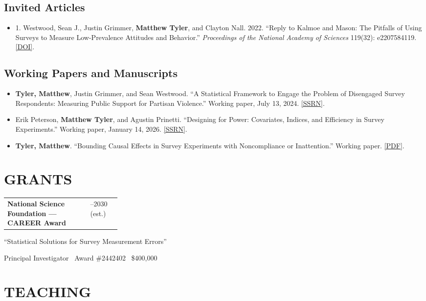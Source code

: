 \documentclass[11pt,a4paper]{article}
\makeatletter
\newcommand{\cvrow}[2]{%
  \noindent\begin{tabularx}{\linewidth}{@{}X>{\raggedleft\arraybackslash}p{0.27\linewidth}@{}}
  #1 & #2
  \end{tabularx}\par
}
\newenvironment{publicationlist}{%
  \begin{itemize}[leftmargin=2.1em,labelsep=0.45em,
                   topsep=0.3em,itemsep=0.6em,parsep=0pt]
}{\end{itemize}}
\newenvironment{manuscriptlist}{%
  \begin{itemize}[leftmargin=0pt,label={},
                   topsep=0.3em,itemsep=0.6em,parsep=0pt]
}{\end{itemize}}
\newcommand{\doi}[1]{\href{https://doi.org/#1}{[DOI]}}
\newcommand{\pdf}[1]{\href{#1}{[PDF]}}
\newcommand{\ssrn}[1]{\href{https://ssrn.com/abstract=#1}{[SSRN]}}
\makeatother
\begin{document}
\subsection*{Invited Articles}
\begin{publicationlist}
\item[1.] Westwood, Sean J., Justin Grimmer, \textbf{Matthew Tyler},
  and Clayton Nall. 2022.
  ``Reply to Kalmoe and Mason: The Pitfalls of Using Surveys to Measure
  Low-Prevalence Attitudes and Behavior.''
  \emph{Proceedings of the National Academy of Sciences}
  119(32): e2207584119. \doi{10.1073/pnas.2207584119}.
\end{publicationlist}

\subsection*{Working Papers and Manuscripts}
\begin{manuscriptlist}
\item \textbf{Tyler, Matthew}, Justin Grimmer, and Sean Westwood.
  ``A Statistical Framework to Engage the Problem of Disengaged Survey
  Respondents: Measuring Public Support for Partisan Violence.''
  Working paper, July 13, 2024. \ssrn{4894008}.

\item Erik Peterson, \textbf{Matthew Tyler}, and Agustin Prinetti.
  ``Designing for Power: Covariates, Indices, and Efficiency in Survey
  Experiments.'' Working paper, January 14, 2026. \ssrn{6117547}.

\item \textbf{Tyler, Matthew}.
  ``Bounding Causal Effects in Survey Experiments with Noncompliance
  or Inattention.'' Working paper.
  \pdf{http://www.weekendu.uh.edu/hobby/cpp/events/texmeth/papers/texmeth_matthew_tyler.pdf}.
\end{manuscriptlist}

\section{GRANTS}
\cvrow{\textbf{National Science Foundation --- CAREER Award}}{2025--2030 (est.)}
``Statistical Solutions for Survey Measurement Errors''\par
Principal Investigator \textbullet\ Award \#2442402 \textbullet\ \$400,000

\section{TEACHING}
\end{document}
